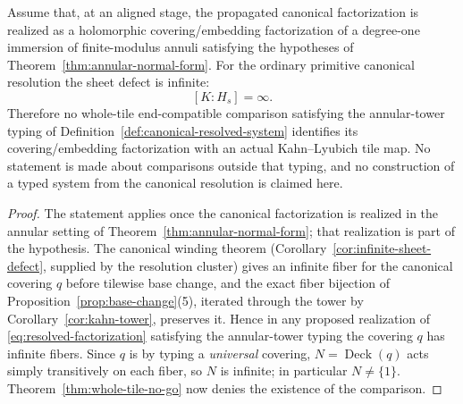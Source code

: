 \begin{corollary}\label{cor:canonical-not-whole-tile}
Assume that, at an aligned stage, the propagated canonical factorization is realized as a holomorphic covering/embedding factorization of a degree-one immersion of finite-modulus annuli satisfying the hypotheses of Theorem~\ref{thm:annular-normal-form}.  For the ordinary primitive canonical resolution the sheet defect is infinite:
\[
[K:H_s]=\infty.
\]
Therefore no whole-tile end-compatible comparison satisfying the annular-tower typing of Definition~\ref{def:canonical-resolved-system} identifies its covering/embedding factorization with an actual Kahn--Lyubich tile map.  No statement is made about comparisons outside that typing, and no construction of a typed system from the canonical resolution is claimed here.
\end{corollary}

\begin{proof}
The statement applies once the canonical factorization is realized in the annular setting of Theorem~\ref{thm:annular-normal-form}; that realization is part of the hypothesis.  The canonical winding theorem (Corollary~\ref{cor:infinite-sheet-defect}, supplied by the resolution cluster) gives an infinite fiber for the canonical covering \(q\) before tilewise base change, and the exact fiber bijection of Proposition~\ref{prop:base-change}(5), iterated through the tower by Corollary~\ref{cor:kahn-tower}, preserves it.  Hence in any proposed realization of \eqref{eq:resolved-factorization} satisfying the annular-tower typing the covering \(q\) has infinite fibers.  Since \(q\) is by typing a \emph{universal} covering, \(N=\operatorname{Deck}(q)\) acts simply transitively on each fiber, so \(N\) is infinite; in particular \(N\ne\{1\}\).  Theorem~\ref{thm:whole-tile-no-go} now denies the existence of the comparison.
\end{proof}